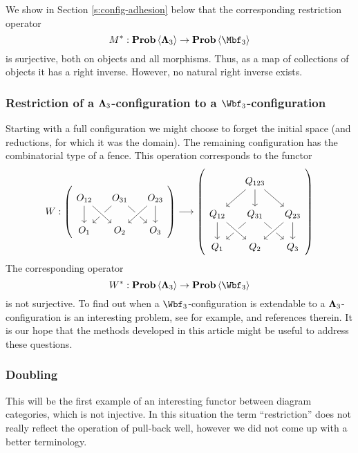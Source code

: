 We show in Section \ref{s:config-adhesion} below that the corresponding 
restriction operator
\[
M^{*}:\prob\<\Lambdabf_{3}>\to\prob\<\Mbf_{3}> 
\]
is surjective, both on objects and all morphisms. Thus, as a map of
collections of objects it has a right inverse. However, no natural right
inverse exists. 

\subsubsection{Restriction of a $\bm\Lambda_{3}$-configuration to
  a $\Wbf_{3}$-configuration} 
\label{s:config-restrictions-fullfence}

Starting with a full configuration we might choose to forget the
initial space (and reductions, for which it was the domain). The
remaining configuration has the combinatorial type of a fence. This
operation corresponds to the functor
\[
W:
\left(
\begin{tikzcd}[column sep=small, row sep=normal,ampersand replacement=\&]
  O_{12}
  \arrow{d}{}
  \&
  O_{31}
  \arrow{dl}{}
  \arrow{dr}{} 
  \&
  O_{23}
  \arrow{d}{}
  \\
  O_{1}
  \&
  O_{2}
  \arrow[leftarrow, crossing over]{ul}
  \arrow[leftarrow, crossing over]{ur}
  \&
  O_{3}
\end{tikzcd}
\right)
\longrightarrow
\left(
\begin{tikzcd}[column sep=small, row sep=normal, ampersand replacement=\&]
  \&
  Q_{123}
  \arrow{dl}{}
  \arrow{d}{}
  \arrow{dr}{}
  \\
  Q_{12}
  \arrow{d}{}
  \&
  Q_{31}
  \arrow{dl}{}
  \arrow{dr}{} 
  \&
  Q_{23}
  \arrow{d}
  \\
  Q_{1}
  \&
  Q_{2}
  \arrow[leftarrow, crossing over]{ul}
  \arrow[leftarrow, crossing over]{ur}
  \&
  Q_{3}
\end{tikzcd}
\right)
\]
The corresponding operator 
\[
W^{*}:\prob\<\Lambdabf_{3}>\to\prob\<\Wbf_{3}>
\]
is not surjective. To find out when a $\Wbf_{3}$-configuration is extendable
to a $\bm\Lambda_{3}$-configuration is an interesting problem, see for
example, \cite{Abramsky-Contextuality-2015} and references
therein.
It is our hope that the methods developed in this article might be
useful to address these questions.

\subsubsection{Doubling}
\label{s:config-restrictions-doubling}
 This will be the first example of an interesting
    functor between diagram categories, which is not injective. In
    this situation the term ``restriction'' does not really reflect
    the operation of pull-back well, however we did not come up with a
    better terminology.
 
